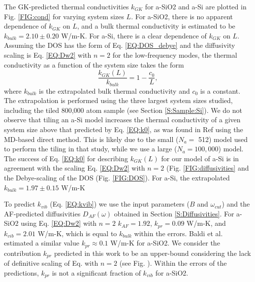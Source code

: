 \documentclass[aps,prb,onecolumn,preprint,superscriptaddress,footinbib,amsmath,amssymb,floatfix]{revtex4}
\begin{document}
The GK-predicted thermal conductivities $k_{GK}$ for a-SiO2 and a-Si 
are plotted in Fig. \ref{FIG:cond} for 
varying system sizes $L$. For a-SiO2, there is no apparent dependence 
of $k_{GK}$ on $L$, and a bulk thermal conductivity is estimated 
to be $k_{bulk}=2.10 \pm 0.20$ W/m-K. 
For a-Si, there is a clear dependence of $k_{GK}$ on 
$L$. Assuming the DOS has the form of Eq. \eqref{EQ:DOS_debye} 
and the diffusivity scaling 
is Eq. \eqref{EQ:Dw2} with $n=2$ 
for the low-frequency modes, 
the thermal conductivity as a function of the system size 
takes the form
\begin{equation}\label{EQ:k0}
\frac{k_{GK}(L)}{k_{bulk}} = 1 - \frac{c_0}{L},
\end{equation}
where $k_{bulk}$ is the extrapolated bulk thermal conductivity and $c_0$ 
is a constant.\cite{shiomi_thermal_2011,esfarjani_heat_2011,
larkin_comparison_2012} 
The extrapolation is performed using the three largest 
system sizes studied, including the tiled 800,000 atom sample (see 
Section \ref{S:Sample:Si}). 
We do not observe that tiling an a-Si model increases 
the thermal 
conductivity of a given system size above that predicted by 
Eq. \eqref{EQ:k0}, as 
was found in Ref  using the MD-based 
direct method. This is likely due to the 
small ($N_a = $ 512) model used to perform the tiling in that study, 
while we use a large ($N_a = 100,000$) model. 
The success of 
Eq. \eqref{EQ:k0} for describing $k_{GK}(L)$ for our model of a-Si 
is in agreement with the scaling Eq. \eqref{EQ:Dw2} with $n=2$ 
(Fig. \ref{FIG:diffusivities} 
and the Debye-scaling of the DOS (Fig. \ref{FIG:DOS}). 
For a-Si, the extrapolated $k_{bulk} = 1.97 \pm 0.15$ W/m-K

To predict $k_{vib}$ (Eq. \eqref{EQ:kvib}) we use the input parameters 
($B$ and $\omega_{cut}$) and the AF-predicted diffusivities 
$D_{AF}(\omega)$ obtained in Section \ref{S:Diffusivities}. 
For a-SiO2 using Eq. \eqref{EQ:Dw2} with $n=2$ $k_{AF} = 1.92$, 
$k_{pr} = 0.09$ W/m-K, and 
$k_{vib} = 2.01$ W/m-K, which is equal to $k_{bulk}$ within 
the errors.  
Baldi et al. estimated a similar value $k_{pr}\approx0.1$ W/m-K 
for a-SiO2.\cite{baldi_thermal_2008} 
We consider the contribution 
$k_{pr}$ predicted in this work to be an upper-bound considering 
the lack of definitive scaling of Eq. with $n=2$ (see Fig. ). 
Within the errors of the predictions, $k_{pr}$ is not a significant 
fraction of $k_{vib}$ for a-SiO2. 
\end{document}
